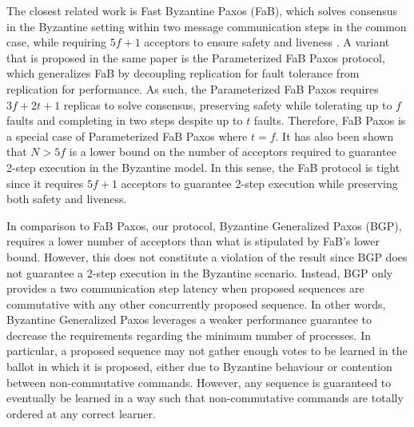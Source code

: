 The closest related work is Fast Byzantine Paxos (FaB), which solves consensus in the Byzantine setting within two message communication steps in the common case, while requiring $5f+1$ acceptors to ensure safety and liveness \cite{Martin2006}. A variant that is proposed in the same paper is the Parameterized FaB Paxos protocol, which generalizes FaB by decoupling replication for fault tolerance from replication for performance. As such, the Parameterized FaB Paxos requires $3f+2t+1$ replicas to solve consensus, preserving safety while tolerating up to $f$ faults and completing in two steps despite up to $t$ faults. Therefore, FaB Paxos is a special case of Parameterized FaB Paxos where $t=f$. It has also been shown that $N>5f$ is a lower bound on the number of acceptors required to guarantee 2-step execution in the Byzantine model. In this sense, the FaB protocol is tight since it requires $5f+1$ acceptors to guarantee 2-step execution while preserving both safety and liveness. \par
In comparison to FaB Paxos, our protocol, Byzantine Generalized Paxos (BGP), requires a lower number of acceptors than what is stipulated by FaB's lower bound. However, this does not constitute a violation of the result since BGP does not guarantee a 2-step execution in the Byzantine scenario. Instead, BGP only provides a two communication step latency when proposed sequences are commutative with any other concurrently proposed sequence. In other words, Byzantine Generalized Paxos leverages a weaker performance guarantee to decrease the requirements regarding the minimum number of processes. In particular, a proposed sequence may not gather enough votes to be learned in the ballot in which it is proposed, either due to Byzantine behaviour or contention between non-commutative commands. However, any sequence is guaranteed to eventually be learned in a way such that non-commutative commands are totally ordered at any correct learner.
